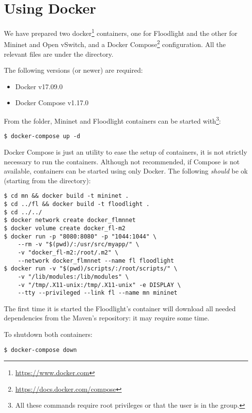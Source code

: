 \section{Using Docker}

We have prepared two docker\footnote{\url{https://www.docker.com}} containers,
one for Floodlight and the other for Mininet and Open vSwitch, and a Docker
Compose\footnote{\url{https://docs.docker.com/compose}} configuration. All the
relevant files are under the  directory.

The following versions (or newer) are required:
\begin{itemize}
	\item Docker v17.09.0
	\item Docker Compose v1.17.0
\end{itemize}

From the  folder, Mininet and Floodlight containers can be started
with\footnote{All these commands require root privileges or that the user is in
the  group.}:
\begin{verbatim}
$ docker-compose up -d
\end{verbatim}

Docker Compose is just an utility to ease the setup of containers, it is not
strictly necessary to run the containers. Although not recommended, if Compose
is not available, containers can be started using only Docker. The following
\emph{should} be ok (starting from the  directory):
\begin{verbatim}
$ cd mn && docker build -t mininet .
$ cd ../fl && docker build -t floodlight .
$ cd ../../
$ docker network create docker_flmnnet
$ docker volume create docker_fl-m2
$ docker run -p "8080:8080" -p "1044:1044" \
    --rm -v "$(pwd)/:/usr/src/myapp/" \
    -v "docker_fl-m2:/root/.m2" \
    --network docker_flmnnet --name fl floodlight
$ docker run -v "$(pwd)/scripts/:/root/scripts/" \
    -v "/lib/modules:/lib/modules" \
    -v "/tmp/.X11-unix:/tmp/.X11-unix" -e DISPLAY \
    --tty --privileged --link fl --name mn mininet
\end{verbatim}

The first time it is started the Floodlight's container will download all needed
dependencies from the Maven's repository: it may require some time.

To shutdown both containers:
\begin{verbatim}
$ docker-compose down
\end{verbatim}

